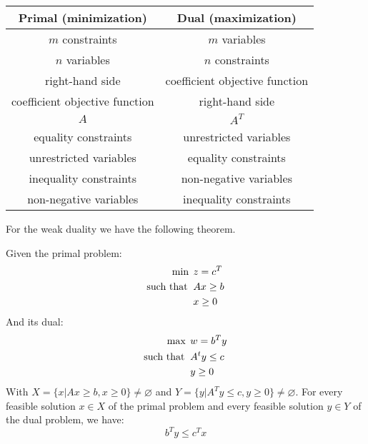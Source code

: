 \begin{table}[H]
    \centering
    \begin{tabular}{cc}
    \hline
    \textbf{Primal (minimization)} & \textbf{Dual (maximization)}   \\ \hline
    $m$ constraints                & $m$ variables                  \\
    $n$ variables                  & $n$ constraints                \\
    right-hand side                & coefficient objective function \\
    coefficient objective function & right-hand side                \\
    $A$                            & $A^T$                          \\
    equality constraints           & unrestricted variables         \\
    unrestricted variables         & equality constraints           \\
    inequality constraints         & non-negative variables         \\
    non-negative variables         & inequality constraints         \\ \hline
    \end{tabular}
\end{table}

For the weak duality we have the following theorem. 
\begin{theorem}
    Given the primal problem: 
    \begin{align*}
        \min                      \:&\: z=c^T            \\
        \textnormal{such that }     &\: Ax\geq b         \\
                                    &\: x \geq 0
    \end{align*}
    And its dual: 
    \begin{align*}
        \max                      \:&\: w=b^Ty              \\
        \textnormal{such that }     &\: A^ty\leq c          \\
                                    &\: y \geq 0
    \end{align*}
    With $X=\{x|Ax \geq b, x \geq 0\} \neq \varnothing$ and $Y=\{y|A^Ty \leq c, y \geq 0\} \neq \varnothing$.
    For every feasible solution $x \in X$ of the primal problem and every feasible solution $y \in Y$ of the dual problem, we have: 
    \[b^Ty \leq c^Tx\]
\end{theorem}



